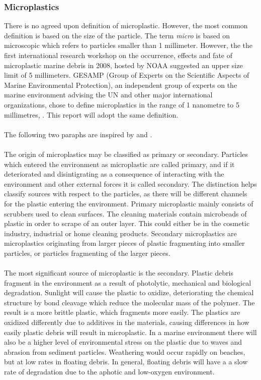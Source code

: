 \subsubsection{Microplastics}
There is no agreed upon definition of microplastic. However, the most common definition is based on the size of the particle. The term \textit{micro} is based on microscopic which refers to particles smaller than 1 millimeter. However, the the first international research workshop on the occurrence, effects and fate of microplastic marine debris in 2008, hosted by NOAA \citep{Arthur2009ProceedingsUSA} suggested an upper size limit of 5 millimeters. GESAMP (Group of Experts on the Scientific Aspects of Marine Environmental Protection), an independent group of experts on the marine environment advising the UN and other major international organizations, chose to define microplastics in the range of 1 nanometre to 5 millimetres, \citep{GESAMP2015SourcesAssessment}. This report will adopt the same definition. \\\\
The following two paraphs are inspired by \citet{GESAMP2015SourcesAssessment} and \citet{Browne2007MicroplasticanConcern}.
\\
\\
The origin of microplastics may be classified as primary or secondary. Particles which entered the environment as microplastic are called primary, and if it deteriorated and disintigrating as a consequence of interacting with the environment and other external forces it is called secondary. The distinction helps classify sources with respect to the particles, as there will be different channels for the plastic entering the environment. Primary microplastic mainly consists of scrubbers used to clean surfaces. The cleaning materials contain microbeads of plastic in order to scrape of an outer layer. This could either be in the cosmetic industry, industrial or home cleaning products. Secondary microplastics are microplastics originating from larger pieces of plastic fragmenting into smaller particles, or particles fragmenting of the larger pieces. 
\\
\\
The most significant source of microplastic is the secondary. Plastic debris fragment in the environment as a result of photolytic, mechanical and biological degradation. Sunlight will cause the plastic to oxidize, deteriorating the chemical structure by bond cleavage which reduce the molecular mass of the polymer. The result is a more brittle plastic, which fragments more easily. The plastics are oxidized differently due to additives in the materials, causing differences in how easily plastic debris will result in microplastic. In a marine environment there will also be a higher level of environmental stress on the plastic due to waves and abrasion from sediment particles. Weathering would occur rapidly on beaches, but at low rates in floating debris. In general, floating debris will have a a slow rate of degradation due to the aphotic and low-oxygen environment. 

